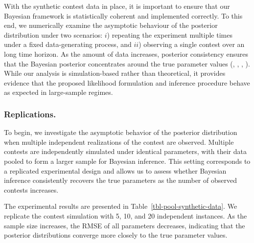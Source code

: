 \documentclass[mnsc]{informs3}
\begin{document}
With the synthetic contest data in place, it is important to ensure that our Bayesian framework is statistically coherent and implemented correctly. 
To this end, we numerically examine the asymptotic behaviour of the posterior distribution under two scenarios:
$i$) repeating the experiment multiple times under a fixed data-generating process, and $ii$) observing a single contest over an long time horizon.
As the amount of data increases, posterior consistency ensures that the Bayesian posterior concentrates around the true parameter values (\citealt{vaart1998asymptotic}, \citealt{ghosal2000convergence}, \citealt{pokern2013posterior}, \citealt{ramamoorthi2015posterior}).
While our analysis is simulation-based rather than theoretical, it provides evidence that the proposed likelihood formulation and inference procedure behave as expected in large-sample regimes.


\subsubsection{Replications.}

To begin, we investigate the asymptotic behavior of the posterior distribution when multiple independent realizations of the contest are observed. 
Multiple contests are independently simulated under identical parameters, with their data pooled to form a larger sample for Bayesian inference.
This setting corresponds to a replicated experimental design and allows us to assess whether Bayesian inference consistently recovers the true parameters as the number of observed contests increases.

The experimental results are presented in Table~\ref{tbl-pool-synthetic-data}. 
We replicate the contest simulation with 5, 10, and 20 independent instances. 
As the sample size increases, the RMSE of all parameters decreases, indicating that the posterior distributions converge more closely to the true parameter values.
\end{document}
